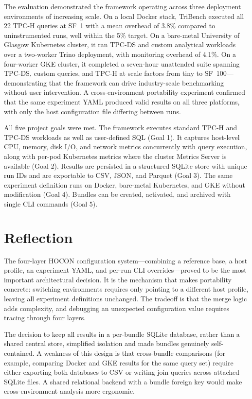 \documentclass{l4proj}
\begin{document}
The evaluation demonstrated the framework operating across three deployment environments of increasing scale. On a local Docker stack, TriBench executed all 22 TPC-H queries at SF~1 with a mean overhead of 3.8\% compared to uninstrumented runs, well within the 5\% target. On a bare-metal University of Glasgow Kubernetes cluster, it ran TPC-DS and custom analytical workloads over a two-worker Trino deployment, with monitoring overhead of 4.1\%. On a four-worker GKE cluster, it completed a seven-hour unattended suite spanning TPC-DS, custom queries, and TPC-H at scale factors from tiny to SF~100---demonstrating that the framework can drive industry-scale benchmarking without user intervention. A cross-environment portability experiment confirmed that the same experiment YAML produced valid results on all three platforms, with only the host configuration file differing between runs.

All five project goals were met. The framework executes standard TPC-H and TPC-DS workloads as well as user-defined SQL (Goal 1). It captures host-level CPU, memory, disk I/O, and network metrics concurrently with query execution, along with per-pod Kubernetes metrics where the cluster Metrics Server is available (Goal 2). Results are persisted in a structured SQLite store with unique run IDs and are exportable to CSV, JSON, and Parquet (Goal 3). The same experiment definition runs on Docker, bare-metal Kubernetes, and GKE without modification (Goal 4). Bundles can be created, activated, and archived with single CLI commands (Goal 5).

\section{Reflection}
\label{sec:reflection}

The four-layer HOCON configuration system---combining a reference base, a host profile, an experiment YAML, and per-run CLI overrides---proved to be the most important architectural decision. It is the mechanism that makes portability concrete: switching environments requires only pointing to a different host profile, leaving all experiment definitions unchanged. The tradeoff is that the merge logic adds complexity, and debugging an unexpected configuration value requires tracing through four layers.

The decision to keep all results in a per-bundle SQLite database, rather than a shared central store, simplified isolation and made bundles genuinely self-contained. A weakness of this design is that cross-bundle comparisons (for example, comparing Docker and GKE results for the same query set) require either exporting both databases to CSV or writing join queries across attached SQLite files. A shared relational backend with a bundle foreign key would make cross-environment analysis more ergonomic.
\end{document}
